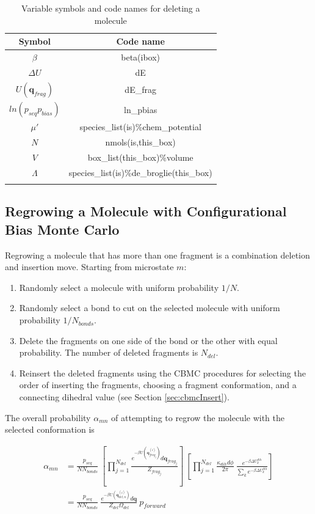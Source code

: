 \begin{table}
\caption{Variable symbols and code names for deleting a molecule}
\label{table:cbmcDelete}
\centering
\begin{tabular}{|c|c|} \hline
 {\bf Symbol} & {\bf Code name} \\ \hline
 $\beta$ & beta(ibox) \\
 $\Delta U$ & dE \\
 $U(\mathbf{q}_{frag})$ & dE\_frag \\
 $ln(p_{seq}p_{bias})$ & ln\_pbias \\
 $\mu'$ & species\_list(is)\%chem\_potential \\
 $N$ & nmols(is,this\_box) \\
 $V$ & box\_list(this\_box)\%volume \\
 $\Lambda$ & species\_list(is)\%de\_broglie(this\_box) \\
 \hline
\multicolumn{2}{c}{}
\end{tabular}
\end{table}

\subsection{Regrowing a Molecule with Configurational Bias Monte Carlo}
\label{sec:cbmcRegrow}
Regrowing a molecule that has more than one fragment is a combination deletion and insertion move. Starting from microstate $m$:

\begin{enumerate}
	\item Randomly select a molecule with uniform probability $1/N$.
	\item Randomly select a bond to cut on the selected molecule with uniform probability $1/N_{bonds}$.
	\item Delete the fragments on one side of the bond or the other with equal probability. The number of deleted fragments is $N_{del}$.
	\item Reinsert the deleted fragments using the CBMC procedures for selecting the order of inserting the fragments, choosing a fragment conformation, and a connecting dihedral value (see Section \ref{sec:cbmcInsert}).
\end{enumerate}

The overall probability $\alpha_{mn}$ of attempting to regrow the molecule with the selected conformation is 

\begin{align}
\alpha_{mn} &= \frac{p_{seq}}{N N_{bonds}}\ \left[\prod_{j=1}^{N_{del}}{\frac{e^{-\beta U(\mathbf{q}^{(i)}_{frag_j})}d\mathbf{q}_{frag_j}}{Z_{frag_j}}}\right]\ \left[\prod_{j=1}^{N_{del}}{\frac{\kappa_{dih}d\phi}{2\pi}\ \frac{e^{-\beta \Delta U_k^{dih}}}{\sum_k{e^{-\beta \Delta U_k^{dih}}}}}\right] \nonumber \\
\label{eq:alpha_cbmcRegrow}
&= \frac{p_{seq}}{N N_{bonds}}\ \frac{e^{-\beta U(\mathbf{q}^{(i)}_{del,n})}d\mathbf{q}}{Z_{del}\Omega_{del}}\ p_{forward}
\end{align}

